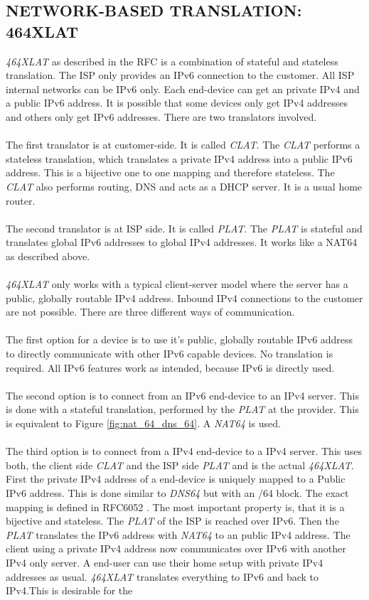 \documentclass[format=sigconf, natbib=true, nonacm=true]{acmart}
\begin{document}
    \subsection{NETWORK-BASED TRANSLATION: 464XLAT}
    \textit{464XLAT} as described in the RFC \cite{rfc6877} is a combination of stateful and stateless translation. The ISP only provides an IPv6 connection to the customer. All ISP internal networks can be IPv6 only. Each end-device can get an private IPv4 and a public IPv6 address. It is possible that some devices only get IPv4 addresses and others only get IPv6 addresses. There are two translators involved.\\\\The first translator is at customer-side. It is called \textit{CLAT}. The \textit{CLAT} performs a stateless translation, which translates a private IPv4 address into a public IPv6 address. This is a bijective one to one mapping and therefore stateless. The \textit{CLAT} also performs routing, DNS and acts as a DHCP server. It is a usual home router.\\\\The second translator is at ISP side. It is called \textit{PLAT}. The \textit{PLAT} is stateful and translates global IPv6 addresses to global IPv4 addresses. It works like a NAT64 as described above.\\\\\textit{464XLAT} only works with a typical client-server model where the server has a public, globally routable IPv4 address. Inbound IPv4 connections to the customer are not possible. There are three different ways of communication.\\\\The first option for a device is to use it's public, globally routable IPv6 address to directly communicate with other IPv6 capable devices. No translation is required. All IPv6 features work as intended, because IPv6 is directly used.\\\\The second option is to connect from an IPv6 end-device to an IPv4 server. This is done with a stateful translation, performed by the \textit{PLAT} at the provider. This is equivalent to Figure \ref{fig:nat_64_dns_64}. A \textit{NAT64} is used.\\\\The third option is to connect from a IPv4 end-device to a IPv4 server. This uses both, the client side \textit{CLAT} and the ISP side \textit{PLAT} and is the actual \textit{464XLAT}. First the private IPv4 address of a end-device is uniquely mapped to a Public IPv6 address. This is done similar to \textit{DNS64} but with an /64 block. The exact mapping is defined in RFC6052 \cite{rfc6052}. The most important property is, that it is a bijective and stateless. The \textit{PLAT} of the ISP is reached over IPv6. Then the \textit{PLAT} translates the IPv6 address with \textit{NAT64} to an public IPv4 address. The client using a private IPv4 address now communicates over IPv6 with another IPv4 only server. A end-user can use their home setup with private IPv4 addresses as usual. \textit{464XLAT} translates everything to IPv6 and back to IPv4.This is desirable for the 
\end{document}
